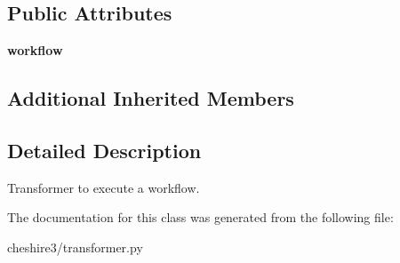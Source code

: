 \subsection*{Public Attributes}
\begin{DoxyCompactItemize}
\item 
\hypertarget{classcheshire3_1_1transformer_1_1_workflow_transformer_a073ab3509f1e4dc09eba6051e5deea0d}{{\bfseries workflow}}\label{classcheshire3_1_1transformer_1_1_workflow_transformer_a073ab3509f1e4dc09eba6051e5deea0d}

\end{DoxyCompactItemize}
\subsection*{Additional Inherited Members}


\subsection{Detailed Description}
\begin{DoxyVerb}Transformer to execute a workflow.\end{DoxyVerb}
 

The documentation for this class was generated from the following file\-:\begin{DoxyCompactItemize}
\item 
cheshire3/transformer.\-py\end{DoxyCompactItemize}
